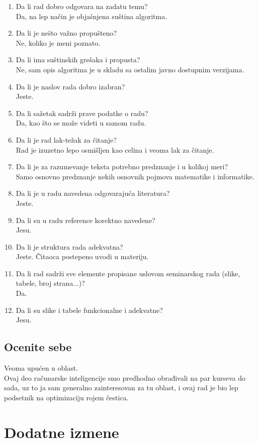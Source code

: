 \documentclass[a4paper]{report}
\begin{document}
\begin{enumerate}
\item Da li rad dobro odgovara na zadatu temu?\\ Da, na lep način je objašnjena suština algoritma.
\item Da li je nešto važno propušteno?\\ Ne, koliko je meni poznato.
\item Da li ima suštinskih grešaka i propusta?\\ Ne, sam opis algoritma je u skladu sa ostalim javno dostupnim verzijama.
\item Da li je naslov rada dobro izabran?\\ Jeste.
\item Da li sažetak sadrži prave podatke o radu?\\ Da, kao što se može videti u samom radu.
\item Da li je rad lak-težak za čitanje?\\ Rad je izuzetno lepo osmišljen kao celina i veoma lak za čitanje.
\item Da li je za razumevanje teksta potrebno predznanje i u kolikoj meri?\\ Samo osnovno predznanje nekih osnovnih pojmova matematike i informatike.
\item Da li je u radu navedena odgovarajuća literatura?\\ Jeste.
\item Da li su u radu reference korektno navedene?\\ Jesu.
\item Da li je struktura rada adekvatna?\\ Jeste. Čitaoca postepeno uvodi u materiju.
\item Da li rad sadrži sve elemente propisane uslovom seminarskog rada (slike, tabele, broj strana...)?\\ Da.
\item Da li su slike i tabele funkcionalne i adekvatne?\\ Jesu.
\end{enumerate}

\section{Ocenite sebe}
Veoma upućen u oblast. \\ Ovaj deo računarske inteligencije smo predhodno obrađivali na par kurseva do sada, uz to ja 
sam generalno zainteresovan za tu oblast, i ovaj rad je bio lep podsetnik na optimizaciju rojem čestica.



\chapter{Dodatne izmene}
\end{document}
